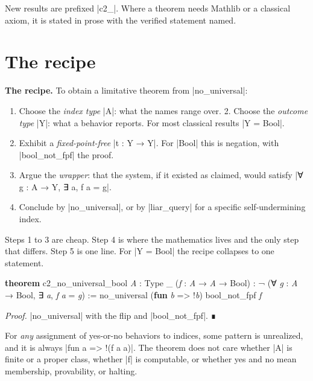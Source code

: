 \documentclass{memoir}
\begin{document}
New results are prefixed \LeanVerb|c2_|. Where a theorem needs Mathlib or a classical
axiom, it is stated in prose with the verified statement named.



\section{The recipe}\label{Two--Schemas--of--Impossibility-005F-005F-005F--Machine--Checked--Limits--of--Trustworthy--Machine--Learning-005F-005F-005F--and--Why--They--Tighten--with--Capability----The--Classical--Limits----The--recipe}

\textbf{The recipe.} To obtain a limitative theorem from \LeanVerb|no_universal|:

\begin{enumerate}
\item Choose the \emph{index type} \LeanVerb|A|: what the names range over. 2. Choose the
\emph{outcome type} \LeanVerb|Y|: what a behavior reports. For most classical
   results \LeanVerb|Y = Bool|.
\item Exhibit a \emph{fixed-point-free} \LeanVerb|t : Y → Y|. For \LeanVerb|Bool| this is negation, with
   \LeanVerb|bool_not_fpf| the proof.
\item Argue the \emph{wrapper}: that the system, if it existed as claimed, would satisfy
   \LeanVerb|∀ g : A → Y, ∃ a, f a = g|.
\item Conclude by \LeanVerb|no_universal|, or by \LeanVerb|liar_query| for a specific
   self-undermining index.

\end{enumerate}


Steps 1 to 3 are cheap. Step 4 is where the mathematics lives and the only step
that differs. Step 5 is one line. For \LeanVerb|Y = Bool| the recipe collapses to one
statement.

\begin{LeanVerbatim}
\textbf{theorem} c2_no_universal_bool \textit{A} : Type _
    (\textit{f} : \textit{A} → \textit{A} → Bool) :
    ¬ (∀ \textit{g} : \textit{A} → Bool, ∃ \textit{a}, \textit{f} \textit{a} = \textit{g}) :=
  no_universal (\textbf{fun} \textit{b} => !\textit{b}) bool_not_fpf \textit{f}

\end{LeanVerbatim}


\emph{Proof.} \LeanVerb|no_universal| with the flip and \LeanVerb|bool_not_fpf|. ∎

For \emph{any} assignment of yes-or-no behaviors to indices, some pattern is
unrealized, and it is always \LeanVerb|fun a => !(f a a)|. The theorem does not care
whether \LeanVerb|A| is finite or a proper class, whether \LeanVerb|f| is computable, or whether
yes and no mean membership, provability, or halting.
\end{document}
